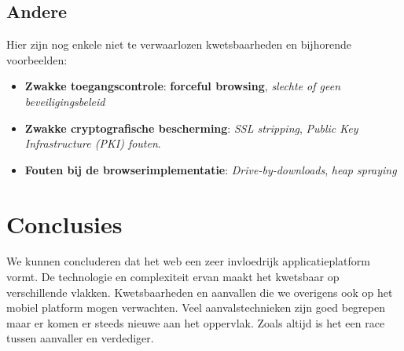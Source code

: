 \documentclass[../main.tex]{subfiles}
\begin{document}
\subsection{Andere}
Hier zijn nog enkele niet te verwaarlozen kwetsbaarheden en bijhorende voorbeelden:
\begin{itemize}
	\item \textbf{Zwakke toegangscontrole}: \textbf{forceful browsing}, \textit{slechte of geen beveiligingsbeleid}
	\item \textbf{Zwakke cryptografische bescherming}: \textit{SSL stripping}, \textit{Public Key Infrastructure (PKI) fouten}.
	\item \textbf{Fouten bij de browserimplementatie}: \textit{Drive-by-downloads}, \textit{heap spraying}
\end{itemize}

\section{Conclusies}
We kunnen concluderen dat het web een zeer invloedrijk applicatieplatform vormt. De technologie en complexiteit ervan maakt het kwetsbaar op verschillende vlakken. Kwetsbaarheden en aanvallen die we overigens ook op het mobiel platform mogen verwachten. Veel aanvalstechnieken zijn goed begrepen maar er komen er steeds nieuwe aan het oppervlak. Zoals altijd is het een race tussen aanvaller en verdediger.
\end{document}
